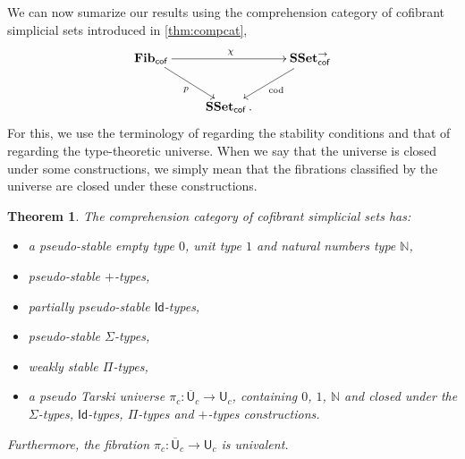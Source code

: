 \documentclass[reqno,10pt,a4paper,oneside,draft]{amsart}
\numberwithin{equation}{section}
\theoremstyle{mythm}
\newtheorem{theorem}{Theorem}[section]
\theoremstyle{mydef}
\theoremstyle{myrmk}
\newcommand{\SSet}{\mathbf{SSet}}
\newcommand{\UU}{\overline{\mathsf{U}}}
\newcommand{\U}{\mathsf{U}}
\newcommand{\Id}{\mathsf{Id}}
\begin{document}
We can now sumarize our results using the comprehension category of cofibrant simplicial sets introduced in \cref{thm:compcat}, 
\[ 
\xymatrix{
\mathbf{Fib}_{ \mathsf{cof}} \ar[dr]_{p} \ar[rr]^{\chi} & & \SSet^{\to}_{\mathsf{cof}} \ar[dl]^{\mathrm{cod}} \\ 
 & \SSet_{\mathsf{cof}} \, . &  }
 \]
For this, we use the terminology of \cite{LumsdaineP:locuoc} regarding the stability conditions and
that of  \cite[Appendix~A]{ShulmanM:allths}  regarding the type-theoretic universe. When we say
that the universe is closed under some constructions, we simply mean that the fibrations classified by the universe are closed under these constructions.

\begin{theorem} \label{th:main_ContextualCat} The comprehension category of cofibrant simplicial sets has:
\begin{itemize}
\item a pseudo-stable empty type $0$, unit type $1$ and natural numbers type $\mathbb{N}$,
\item pseudo-stable $+$-types,
\item partially pseudo-stable $\Id$-types,
\item pseudo-stable $\Sigma$-types,
\item weakly stable $\Pi$-types,
\item a pseudo Tarski universe $\pi_c: \UU_c \rightarrow \U_c$, containing $0$, $1$, $\mathbb{N}$ and closed under the $\Sigma$-types, $\Id$-types, $\Pi$-types and $+$-types constructions.
\end{itemize}
Furthermore, the fibration $\pi_c: \UU_c \rightarrow \U_c $ is univalent.
\end{theorem}
\end{document}
